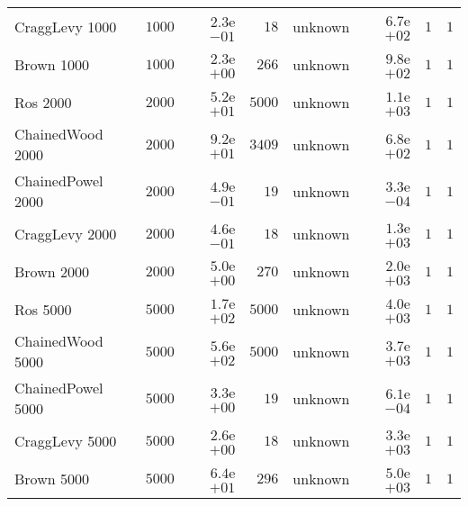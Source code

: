 \begin{longtable}[c]{lrrrrrrr}
CraggLevy 1000 & \( 1000\) & \( 2.3\)e\(-01\) & \(   18\) & unknown & \( 6.7\)e\(+02\) & \(    1\) & \(    1\) \\
Brown 1000 & \( 1000\) & \( 2.3\)e\(+00\) & \(  266\) & unknown & \( 9.8\)e\(+02\) & \(    1\) & \(    1\) \\
Ros 2000 & \( 2000\) & \( 5.2\)e\(+01\) & \( 5000\) & unknown & \( 1.1\)e\(+03\) & \(    1\) & \(    1\) \\
ChainedWood 2000 & \( 2000\) & \( 9.2\)e\(+01\) & \( 3409\) & unknown & \( 6.8\)e\(+02\) & \(    1\) & \(    1\) \\
ChainedPowel 2000 & \( 2000\) & \( 4.9\)e\(-01\) & \(   19\) & unknown & \( 3.3\)e\(-04\) & \(    1\) & \(    1\) \\
CraggLevy 2000 & \( 2000\) & \( 4.6\)e\(-01\) & \(   18\) & unknown & \( 1.3\)e\(+03\) & \(    1\) & \(    1\) \\
Brown 2000 & \( 2000\) & \( 5.0\)e\(+00\) & \(  270\) & unknown & \( 2.0\)e\(+03\) & \(    1\) & \(    1\) \\
Ros 5000 & \( 5000\) & \( 1.7\)e\(+02\) & \( 5000\) & unknown & \( 4.0\)e\(+03\) & \(    1\) & \(    1\) \\
ChainedWood 5000 & \( 5000\) & \( 5.6\)e\(+02\) & \( 5000\) & unknown & \( 3.7\)e\(+03\) & \(    1\) & \(    1\) \\
ChainedPowel 5000 & \( 5000\) & \( 3.3\)e\(+00\) & \(   19\) & unknown & \( 6.1\)e\(-04\) & \(    1\) & \(    1\) \\
CraggLevy 5000 & \( 5000\) & \( 2.6\)e\(+00\) & \(   18\) & unknown & \( 3.3\)e\(+03\) & \(    1\) & \(    1\) \\
Brown 5000 & \( 5000\) & \( 6.4\)e\(+01\) & \(  296\) & unknown & \( 5.0\)e\(+03\) & \(    1\) & \(    1\) \\
\hline 
\end{longtable}

